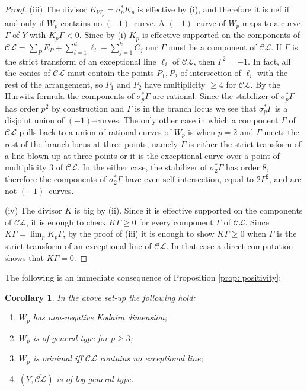 \documentclass[12pt]{amsart}
\theoremstyle{plain}
\newtheorem{corollary}[thm]{Corollary}
\theoremstyle{definition}
\renewcommand\ge{\geqslant}
\newcommand\CL{\mathcal{CL}}
\newcommand\oCL{\overline{\mathcal{CL}}}
\begin{document}
\begin{proof}
(iii) The divisor  $K_{W_p}=\sigma_p^*K_p$ is effective by (i),  and therefore  it is nef if and only if $W_p$ contains no $(-1)$--curve. A $(-1)$--curve of $W_p$ maps to a curve $\Gamma$ of $Y$ with $K_p\Gamma<0$. Since by (i) $K_p$ is effective supported on the components of $\oCL=\sum_PE_P+\sum_{i=1}^d\bar \ell_i+\sum_{j=1}^k\bar C_j$ our $\Gamma$ must be a component of $\CL$.  If $\Gamma$ is the strict transform of an exceptional line $\ell_i$ of $\CL$, then $\Gamma^2=-1$. In fact, all the conics of $\CL$ must contain the points $P_1, P_2$ of intersection of $\ell_i$ with the rest of the arrangement, so $P_1$ and $P_2$ have multiplicity $\ge 4$ for $\CL$. 
By the Hurwitz formula the components of $\sigma_p^*\Gamma$ are rational. Since the stabilizer of $\sigma_p^*\Gamma$ has order $p^2$ by construction and $\Gamma$ is in the branch locus we see that $\sigma_p^*\Gamma$ is a disjoint union of $(-1)$--curves.
The only other case in which a component $\Gamma$ of $\oCL$ pulls back to a union of rational curves of $W_p$ is when $p=2$ and $\Gamma$ meets the rest of the branch locus at three points, namely $\Gamma$ is either the strict transform of a line blown up at three points or it is the exceptional curve over a point of multiplicity $3$ of $\CL$. In the either case, the stabilizer of $\sigma_2^*\Gamma$ has order $8$, therefore the components of $\sigma_2^*\Gamma$ have even self-intersection, equal to $2\Gamma^2$, and are not $(-1)$--curves.

(iv) The divisor $K$ is big by (ii). Since it is effective  supported on the components of $\oCL$, it is enough to check $K\Gamma\ge 0$ for every component $\Gamma$ of $\oCL$. Since $K\Gamma=\lim_p K_p\Gamma$, by the proof of (iii) it is enough to show $K\Gamma\ge 0$ when $\Gamma$ is the strict transform of an exceptional line of $\CL$. In that case a direct computation shows that $K\Gamma=0$.
\end{proof}

The following is an immediate consequence of Proposition \ref{prop: positivity}:

\begin{corollary}\label{cor: positivity} In the above set-up the following hold:
\begin{enumerate} 
\item $W_p$ has non-negative Kodaira dimension;
\item $W_p$ is of general type  for $p\ge 3$;
\item $W_p$ is minimal iff $\CL$ contains no exceptional line; 
\item $(Y,\oCL)$ is of log general type. 
\end{enumerate}
\end{corollary}
\end{document}
